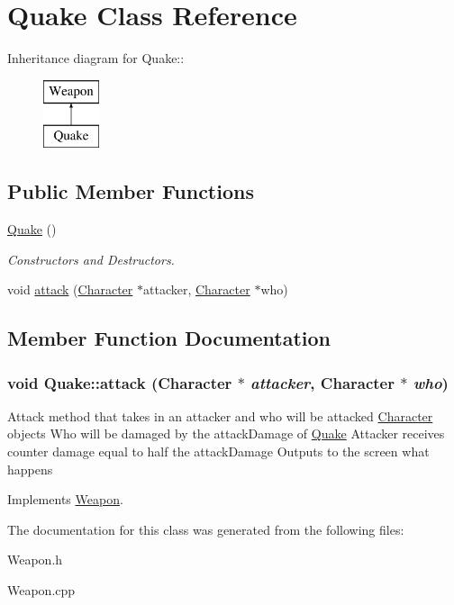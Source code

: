 \hypertarget{classQuake}{
\section{Quake Class Reference}
\label{classQuake}
}
Inheritance diagram for Quake::\begin{figure}[H]
\begin{center}
\leavevmode
\includegraphics[height=2cm]{classQuake}
\end{center}
\end{figure}
\subsection*{Public Member Functions}
\begin{DoxyCompactItemize}
\item 
\hypertarget{classQuake_a078671448c451e8872f72ec831eb4087}{
\hyperlink{classQuake_a078671448c451e8872f72ec831eb4087}{Quake} ()}
\label{classQuake_a078671448c451e8872f72ec831eb4087}

\begin{DoxyCompactList}\small\item\em Constructors and Destructors. \item\end{DoxyCompactList}\item 
void \hyperlink{classQuake_a0b220efa98ae653508cb0a130fbd8a03}{attack} (\hyperlink{classCharacter}{Character} $\ast$attacker, \hyperlink{classCharacter}{Character} $\ast$who)
\end{DoxyCompactItemize}


\subsection{Member Function Documentation}
\hypertarget{classQuake_a0b220efa98ae653508cb0a130fbd8a03}{
\subsubsection[{attack}]{\setlength{\rightskip}{0pt plus 5cm}void Quake::attack ({\bf Character} $\ast$ {\em attacker}, \/  {\bf Character} $\ast$ {\em who})}}
\label{classQuake_a0b220efa98ae653508cb0a130fbd8a03}
Attack method that takes in an attacker and who will be attacked \hyperlink{classCharacter}{Character} objects Who will be damaged by the attackDamage of \hyperlink{classQuake}{Quake} Attacker receives counter damage equal to half the attackDamage Outputs to the screen what happens 

Implements \hyperlink{classWeapon_a74d99dd40d8872718710bcf94fff98d7}{Weapon}.

The documentation for this class was generated from the following files:\begin{DoxyCompactItemize}
\item 
Weapon.h\item 
Weapon.cpp\end{DoxyCompactItemize}
